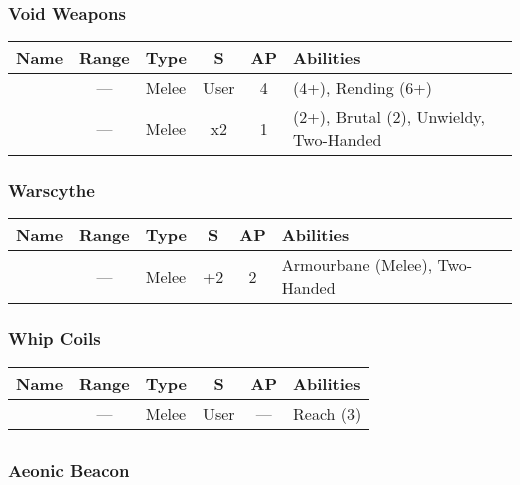 \subsubsection{Void Weapons}

\label{Voidblade} \label{Voidscythe}
\noindent
\begin{NiceTabular}{L{115 pt} c C{40pt} *{2}{c} >{\raggedright\arraybackslash}p{240pt}}
	Name & Range & Type & S & AP & Abilities \\
	\hline
	 & — & Melee & User & 4 &  (4+), Rending (6+) \\
	  & — & Melee & x2 & 1 &  (2+), Brutal (2), Unwieldy, Two-Handed \\
\end{NiceTabular}

\subsubsection{Warscythe}
\label{Warscythe}
\noindent
\begin{NiceTabular}{L{115 pt} c C{40pt} *{2}{c} >{\raggedright\arraybackslash}p{240pt}}
	Name & Range & Type & S & AP & Abilities \\
	\hline
	 & — & Melee & +2 & 2 & Armourbane (Melee), Two-Handed \\
\end{NiceTabular}

\subsubsection{Whip Coils}
\label{Whip Coils}
\noindent
\begin{NiceTabular}{L{115 pt} c C{40pt} *{2}{c} >{\raggedright\arraybackslash}p{240pt}}
	Name & Range & Type & S & AP & Abilities \\
	\hline
	 & — & Melee & User & — & Reach (3) \\
\end{NiceTabular}



\subsection[Technoarkana]{} \label{Technoarcana}

\subsubsection{Aeonic Beacon} \label{Aeonic Beacon}


